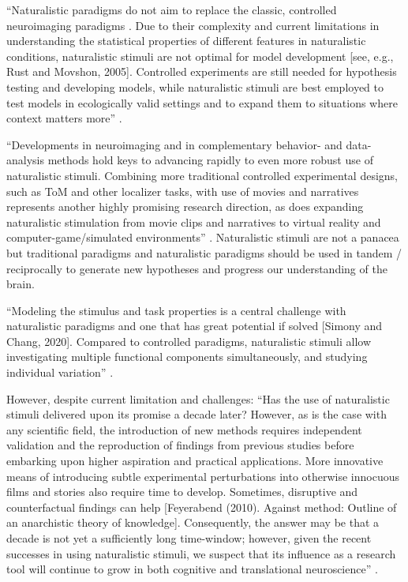 %
``Naturalistic paradigms do not aim to replace the classic, controlled
neuroimaging paradigms \citep{sonkusare2019naturalistic}.
%
Due to their complexity and current limitations in understanding the statistical
properties of different features in naturalistic conditions, naturalistic
stimuli are not optimal for model development [see, e.g., Rust and Movshon,
2005].
%
Controlled experiments are still needed for hypothesis testing and developing
models, while naturalistic stimuli are best employed to test models in
ecologically valid settings and to expand them to situations where context
matters more'' \citep[][p. 19]{saarimaki2021naturalistic}.

%
``Developments in neuroimaging and in complementary behavior- and
data-analysis methods hold keys to advancing rapidly to even more robust use of
naturalistic stimuli.
%
Combining more traditional controlled experimental designs, such as ToM and
other localizer tasks, with use of movies and narratives represents another
highly promising research direction, as does expanding naturalistic stimulation
from movie clips and narratives to virtual reality and computer-game/simulated
environments'' \citep{jaaskelainen2021movies}.
%
Naturalistic stimuli are not a panacea but traditional paradigms and
naturalistic paradigms should be used in tandem / reciprocally to generate new
hypotheses and progress our understanding of the brain.

%
``Modeling the stimulus and task properties is a central challenge with
naturalistic paradigms and one that has great potential if solved [Simony and
Chang, 2020].
%
Compared to controlled paradigms, naturalistic stimuli allow investigating
multiple functional components simultaneously, and studying individual
variation'' \citep{saarimaki2021naturalistic}.

However, despite current limitation and challenges:
%
``Has the use of naturalistic stimuli delivered upon its promise a decade later?
%
However, as is the case with any scientific field, the introduction of new
methods requires independent validation and the reproduction of findings from
previous studies before embarking upon higher aspiration and practical
applications.
%
More innovative means of introducing subtle experimental perturbations into
otherwise innocuous films and stories also require time to develop.
%
Sometimes, disruptive and counterfactual findings can help [Feyerabend (2010).
Against method: Outline of an anarchistic theory of knowledge].
%
Consequently, the answer may be that a decade is not yet a sufficiently long
time-window;
%
however, given the recent successes in using naturalistic stimuli, we suspect
that its influence as a research tool will continue to grow in both cognitive
and translational neuroscience'' \citep{sonkusare2019naturalistic}.

